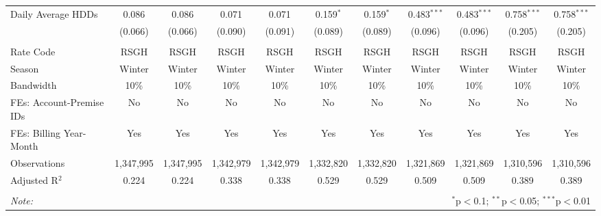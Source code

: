 \begin{table}[!htbp]
\begin{adjustbox}{scale = 0.75}
\begin{tabular}{@{\extracolsep{5pt}}lcccccccccc}
 Daily Average HDDs & 0.086 & 0.086 & 0.071 & 0.071 & 0.159$^{*}$ & 0.159$^{*}$ & 0.483$^{***}$ & 0.483$^{***}$ & 0.758$^{***}$ & 0.758$^{***}$ \\ 
  & (0.066) & (0.066) & (0.090) & (0.091) & (0.089) & (0.089) & (0.096) & (0.096) & (0.205) & (0.205) \\ 
\hline \\[-1.8ex] 
Rate Code & RSGH & RSGH & RSGH & RSGH & RSGH & RSGH & RSGH & RSGH & RSGH & RSGH \\ 
Season & Winter & Winter & Winter & Winter & Winter & Winter & Winter & Winter & Winter & Winter \\ 
Bandwidth & 10\% & 10\% & 10\% & 10\% & 10\% & 10\% & 10\% & 10\% & 10\% & 10\% \\ 
FEs: Account-Premise IDs & No & No & No & No & No & No & No & No & No & No \\ 
FEs: Billing Year-Month & Yes & Yes & Yes & Yes & Yes & Yes & Yes & Yes & Yes & Yes \\ 
Observations & 1,347,995 & 1,347,995 & 1,342,979 & 1,342,979 & 1,332,820 & 1,332,820 & 1,321,869 & 1,321,869 & 1,310,596 & 1,310,596 \\ 
Adjusted R$^{2}$ & 0.224 & 0.224 & 0.338 & 0.338 & 0.529 & 0.529 & 0.509 & 0.509 & 0.389 & 0.389 \\ 
\hline 
\hline \\[-1.8ex] 
\textit{Note:}  & \multicolumn{10}{r}{$^{*}$p$<$0.1; $^{**}$p$<$0.05; $^{***}$p$<$0.01} \\ 
\end{tabular} 
\end{adjustbox}
\end{table} 
